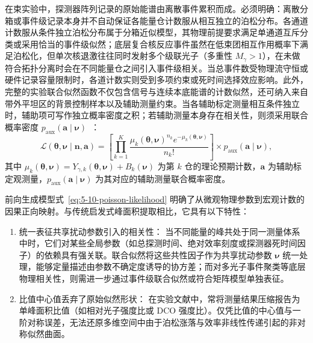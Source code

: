 在束实验中，探测器阵列记录的原始能谱由离散事件累积而成。必须明确：离散分箱或事件级记录本身并不自动保证各能量仓计数服从相互独立的泊松分布。各通道计数服从条件独立泊松分布属于分箱近似模型，其物理前提要求满足单通道互斥分类或采用恰当的事件级似然；底层复合核反应事件虽然在低束团相互作用概率下满足泊松化，但单次核退激往往同时发射多个级联光子（多重性 $M_\gamma > 1$），在未做符合拓扑分离时会在不同能量仓之间引入事件级相关。当总事件数受物理流守恒或硬件记录容量限制时，各道计数实则受到多项约束或死时间选择效应影响。此外，完整的实验联合似然函数不仅包含信号与连续本底能谱的计数似然，还可纳入来自带外平坦区的背景控制样本以及辅助测量约束。当各辅助标定测量相互条件独立时，辅助项可写作独立概率密度之积；若辅助测量本身存在相关性，则须采用联合概率密度 $p_{\mathrm{aux}}(\mathbf{a} \mid \boldsymbol{\nu})$~\cite{book-zhu-probability-statistics-in-physics, book-behnke-data-analysis-hep, baker-cousins-1984-histogram-fits}：
\begin{equation}\label{eq:5-10-poisson-likelihood}
\mathcal{L}(\boldsymbol{\theta}, \boldsymbol{\nu} \mid \mathbf{n}, \mathbf{a}) = \left[ \prod_{k=1}^K \frac{\mu_k(\boldsymbol{\theta}, \boldsymbol{\nu})^{n_k} e^{-\mu_k(\boldsymbol{\theta}, \boldsymbol{\nu})}}{n_k!} \right] \times p_{\mathrm{aux}}(\mathbf{a} \mid \boldsymbol{\nu}),
\end{equation}
其中 $\mu_k(\boldsymbol{\theta}, \boldsymbol{\nu}) = Y_{\gamma, k}(\boldsymbol{\theta}, \boldsymbol{\nu}) + B_k(\boldsymbol{\nu})$ 为第 $k$ 仓的理论预期计数，$\mathbf{a}$ 为辅助标定观测量，$p_{\mathrm{aux}}(\mathbf{a} \mid \boldsymbol{\nu})$ 为其对应的辅助测量联合概率密度。

前向生成模型式~\eqref{eq:5-10-poisson-likelihood} 明确了从微观物理参数到宏观计数的因果正向映射。与传统启发式峰面积提取相比，它具有以下特性：
\begin{enumerate}
\item 统一表征共享扰动参数引入的相关性：
当不同能量的峰共处于同一测量体系中时，它们对某些全局参数（如总探测时间、绝对效率刻度或探测器死时间因子）的依赖具有强关联。联合似然将这些共性因子作为共享扰动参数 $\boldsymbol{\nu}$ 统一处理，能够定量描述由参数不确定度诱导的协方差；而对多光子事件聚类等底层物理相关性，则需进一步通过事件级联合似然或符合矩阵模型单独表征。
\item 比值中心值丢弃了原始似然形状：
在实验文献中，常将测量结果压缩报告为单峰面积比值（如相对光子强度比或 DCO 强度比）。仅凭比值的中心值与一阶对称误差，无法还原多维空间中由于泊松涨落与效率非线性传递引起的非对称似然曲面。
\end{enumerate}

